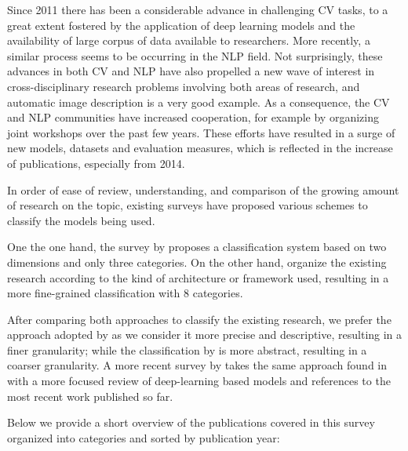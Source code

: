 Since 2011 there has been a considerable advance in challenging CV tasks, to a great extent fostered by the application of deep learning models and the availability of large corpus of data available to researchers. More recently, a similar process seems to be occurring in the NLP field. Not surprisingly, these advances in both CV and NLP have also propelled a new wave of interest in cross-disciplinary research problems involving both areas of research, and automatic image description is a very good example. As a consequence, the CV and NLP communities have increased cooperation, for example by organizing joint workshops over the past few years. These efforts have resulted in a surge of new models, datasets and evaluation measures, which is reflected in the increase of publications, especially from 2014. 

In order of ease of review, understanding, and comparison of the growing amount of research on the topic, existing surveys have proposed various schemes to classify the models being used.

One the one hand, the survey by \citet{Bernardi2017} proposes a classification system based on two dimensions and only three categories. On the other hand, \citet{Bai2018} organize the existing research according to the kind of architecture or framework used, resulting in a more fine-grained classification with 8 categories. 

After comparing both approaches to classify the existing research, we prefer the approach adopted by \citet{Bai2018} as we consider it more precise and descriptive,  resulting in a finer granularity; while the classification by \cite{Bernardi2017} is more abstract, resulting in a coarser granularity. A more recent survey by \citet{Hossain2019} takes the same approach found in \citep{Bai2018} with a more focused review of deep-learning based models and references to the most recent work published so far.

Below we provide a short overview of the publications covered in this survey organized into categories and sorted by publication year:

